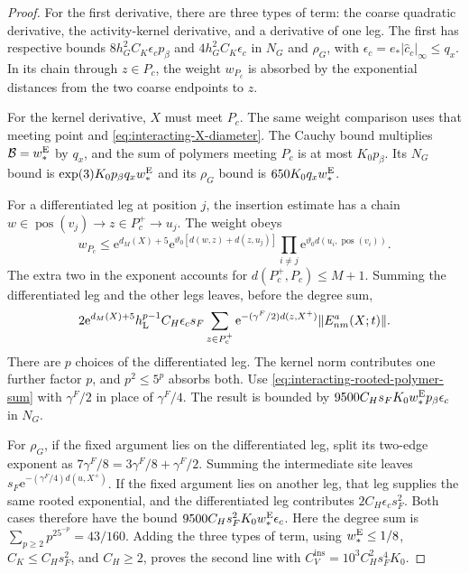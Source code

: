 \begin{proof}
For the first derivative, there are three
types of term: the coarse quadratic derivative,
the activity-kernel derivative, and a derivative
of one leg. The first has respective bounds
$8h_G^2C_K\epsilon_cp_\beta$ and
$4h_G^2C_K\epsilon_c$ in $N_G$ and $\rho_G$,
with $\epsilon_c=e_*|\widehat c_c|_\infty\le q_x$.
In its chain through $z\in P_c$, the weight
$w_{P_c}$ is absorbed by the exponential
distances from the two coarse endpoints to $z$.

For the kernel derivative, $X$ must meet $P_c$.
The same weight comparison uses that meeting
point and \eqref{eq:interacting-X-diameter}.
The Cauchy bound multiplies
$\mathcal B=w_*^{\rm E}$ by $q_x$, and
the sum of polymers meeting $P_c$ is at most
$K_0p_\beta$. Its $N_G$ bound is
$\exp(3)K_0p_\beta q_xw_*^{\rm E}$ and its
$\rho_G$ bound is $650K_0q_xw_*^{\rm E}$.

For a differentiated leg at position $j$, the
insertion estimate has a chain
$w\in\operatorname{pos}(v_j)\to z\in P_c^+\to u_j$.
The weight obeys
\[
 w_{P_c}\le \mathrm e^{d_M(X)+5}
 \mathrm e^{\vartheta_0[d(w,z)+d(z,u_j)]}
            \prod_{i\ne j}\mathrm e^{\vartheta_0d(u_i,\operatorname{pos}(v_i))}.
\]
The extra two in the exponent accounts for
$d(P_c^+,P_c)\le M+1$.
Summing the differentiated leg and the other
legs leaves, before the degree sum,
\[
 2\mathrm e^{d_M(X)+5}h_{\rm L}^{p-1}
       C_H\epsilon_cs_F
       \sum_{z\in P_c^+}\mathrm e^{-(\gamma^F/2)d(z,X^+)}
                                      \|E^a_{nm}(X;t)\|.
\]
There are $p$ choices of the differentiated
leg. The kernel norm contributes one further
factor $p$, and $p^2\le5^p$ absorbs both.
Use \eqref{eq:interacting-rooted-polymer-sum}
with $\gamma^F/2$ in place of $\gamma^F/4$.
The result is bounded by
$9500C_Hs_FK_0w_*^{\rm E}p_\beta\epsilon_c$
in $N_G$.

For $\rho_G$, if the fixed argument lies on
the differentiated leg, split its two-edge
exponent as $7\gamma^F/8=3\gamma^F/8+\gamma^F/2$.
Summing the intermediate site leaves
$s_F\mathrm e^{-(\gamma^F/4)d(u,X^+)}$.
If the fixed argument lies on another leg,
that leg supplies the same rooted exponential,
and the differentiated leg contributes
$2C_H\epsilon_cs_F^2$.
Both cases therefore have the bound
$9500C_Hs_F^2K_0w_*^{\rm E}\epsilon_c$.
Here the degree sum is
$\sum_{p\ge2}p^25^{-p}=43/160$.
Adding the three types of term, using
$w_*^{\rm E}\le1/8$, $C_K\le C_Hs_F^2$,
and $C_H\ge2$, proves the second line with
$C_V^{\mathrm{ins}}=10^3C_H^2s_F^4K_0$.


\end{proof}
